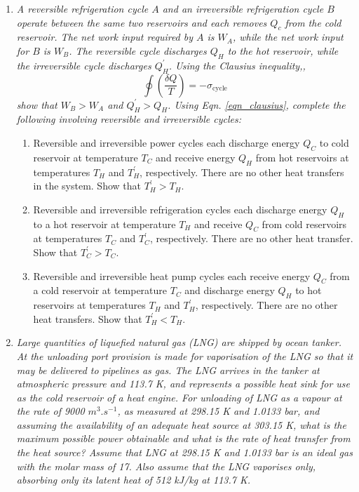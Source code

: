 \documentclass[12pts,a4paper,amsmath,amssymb,floatfix]{article}%
\newcommand{\frc}{\displaystyle\frac}
\begin{document}
\begin{enumerate}[label=\bfseries Problem \arabic*:]
\item {\it A reversible refrigeration cycle $A$ and an irreversible refrigeration cycle $B$ operate between the same two reservoirs and each removes $Q_{c}$ from the cold reservoir. The net work input required by $A$ is $W_{A}$, while the net work input for $B$ is $W_{B}$. The reversible cycle discharges $Q_{H}$ to the hot reservoir, while the irreversible cycle discharges $Q^{\prime}_{H}$.  Using the Clausius inequality,, 
\begin{equation}
\oint\left(\frc{\delta Q}{T}\right) = - \sigma_{\text{cycle}} \label{eqn_clausius}
\end{equation}
show that $W_{B} > W_{A}$ and $Q^{\prime}_{H}>Q_{H}$. Using Eqn. \ref{eqn_clausius}, complete the following involving reversible and irreversible cycles:
\begin{enumerate}
\item Reversible and irreversible power cycles each discharge energy $Q_{C}$ to cold reservoir at temperature $T_{C}$ and receive energy $Q_{H}$ from hot reservoirs at temperatures $T_{H}$ and $T^{\prime}_{H}$, respectively. There are no other heat transfers in the system. Show that $T^{\prime}_{H}>T_{H}$.
\item Reversible and irreversible refrigeration cycles each discharge energy $Q_{H}$ to a hot reservoir at temperature $T_{H}$ and receive $Q_{C}$ from cold reservoirs at temperatures $T_{C}$ and $T^{\prime}_{C}$, respectively. There are no other heat transfer. Show that $T^{\prime}_{C}>T_{C}$.
\item Reversible and irreversible heat pump cycles each receive energy $Q_{C}$ from a cold reservoir at temperature $T_{C}$ and discharge energy $Q_{H}$ to hot reservoirs at temperatures $T_{H}$ and $T^{\prime}_{H}$, respectively. There are no other heat transfers. Show that $T^{\prime}_{H}<T_{H}$. 
\end{enumerate}
}

\item {\it Large quantities of liquefied natural gas (LNG) are shipped by ocean tanker. At the unloading port provision is made for vaporisation of the LNG so that it may be delivered to pipelines as gas. The LNG arrives in the tanker at atmospheric pressure and 113.7 K, and represents a possible heat sink for use as the cold reservoir of a heat engine. For unloading of LNG as a vapour at the rate of 9000 $m^{3}.s^{-1}$, as measured at 298.15 K and 1.0133 bar, and assuming the availability of an adequate heat source at 303.15 K, what is the maximum possible power obtainable and what is the rate of heat transfer from the heat source? Assume that LNG at 298.15 K and 1.0133 bar is an ideal gas with the molar mass of 17. Also assume that the LNG vaporises only, absorbing only its latent heat of 512 kJ/kg at 113.7 K.}




\end{enumerate}
\end{document}
